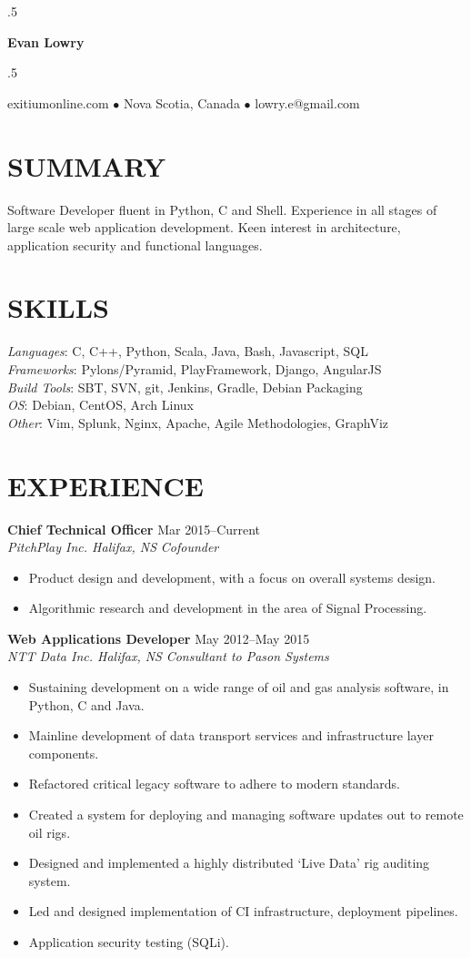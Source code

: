 \documentclass[line,margin]{res}
\begin{document}
\moveleft.5\hoffset\centerline{\LARGE\bf Evan Lowry}
\moveleft.5\hoffset\centerline{exitiumonline.com   {$\bullet$}   Nova Scotia, Canada {$\bullet$}   lowry.e@gmail.com}
 
\begin{resume}
\section{SUMMARY}
Software Developer fluent in Python, C and Shell. Experience in all stages of
large scale web application development. Keen interest in architecture, 
application security and functional languages.

\section{SKILLS}
\textit{Languages}: C, C++, Python, Scala, Java, Bash, Javascript, SQL \\
\textit{Frameworks}: Pylons/Pyramid, PlayFramework, Django, AngularJS \\
\textit{Build Tools}: SBT, SVN, git, Jenkins, Gradle, Debian Packaging \\
\textit{OS}: Debian, CentOS, Arch Linux \\
\textit{Other}: Vim, Splunk, Nginx, Apache, Agile Methodologies, GraphViz

\section{EXPERIENCE}
\textbf{Chief Technical Officer} \hfill Mar 2015--Current \\
\textit{PitchPlay Inc. Halifax, NS} \hfill \textit{Cofounder}
\begin{itemize} \itemsep-2pt
    \item Product design and development, with a focus on overall systems design.
    \item Algorithmic research and development in the area of Signal Processing.
\end{itemize}

\textbf{Web Applications Developer} \hfill May 2012--May 2015 \\
\textit{NTT Data Inc. Halifax, NS} \hfill \textit{Consultant to Pason Systems}
\begin{itemize} \itemsep-2pt
    \item Sustaining development on a wide range of oil and gas analysis software, in Python, C and Java.
    \item Mainline development of data transport services and infrastructure layer components.
    \item Refactored critical legacy software to adhere to modern standards.
    \item Created a system for deploying and managing software updates out to remote oil rigs.
    \item Designed and implemented a highly distributed `Live Data' rig auditing system.
    \item Led and designed implementation of CI infrastructure, deployment pipelines.
    \item Application security testing (SQLi).
\end{itemize}


\end{resume}
\end{document}
